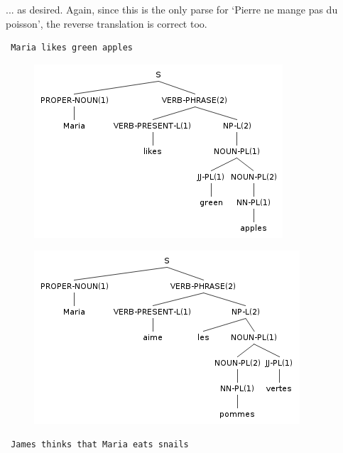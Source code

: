 \documentclass[11pt]{article}
\begin{document}
... as desired. Again, since this is the only parse for `Pierre ne mange pas du poisson', the reverse translation is correct too.

\begin{verbatim} Maria likes green apples \end{verbatim}

\begin{figure}[H]
\includegraphics[scale=0.8]{maria-likes-green-apples.png}
\end{figure}
\begin{figure}[H]
\includegraphics[scale=0.8]{maria-aime-les-pommes-vertes.png}
\end{figure}

\begin{verbatim} James thinks that Maria eats snails \end{verbatim}
\end{document}
